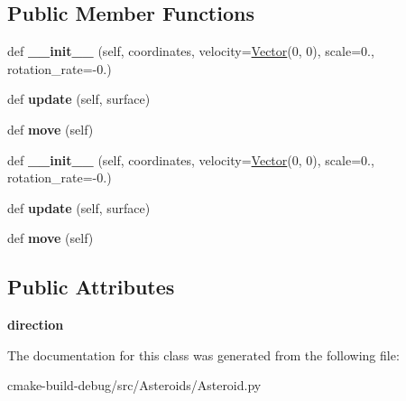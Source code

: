 \subsection*{Public Member Functions}
\begin{DoxyCompactItemize}
\item 
def {\bfseries \+\_\+\+\_\+init\+\_\+\+\_\+} (self, coordinates, velocity=\hyperlink{classVector_1_1Vector}{Vector}(0, 0), scale=0., rotation\+\_\+rate=-\/0.)\hypertarget{classAsteroid_1_1Asteroid_a97fe00ef73eaa80de7eec57530565e7c}{}\label{classAsteroid_1_1Asteroid_a97fe00ef73eaa80de7eec57530565e7c}

\item 
def {\bfseries update} (self, surface)\hypertarget{classAsteroid_1_1Asteroid_ac5a9f9ae0dfd3ff4aa2dabfdd820ebd1}{}\label{classAsteroid_1_1Asteroid_ac5a9f9ae0dfd3ff4aa2dabfdd820ebd1}

\item 
def {\bfseries move} (self)\hypertarget{classAsteroid_1_1Asteroid_af44489831e21c1caa55035370f671d41}{}\label{classAsteroid_1_1Asteroid_af44489831e21c1caa55035370f671d41}

\item 
def {\bfseries \+\_\+\+\_\+init\+\_\+\+\_\+} (self, coordinates, velocity=\hyperlink{classVector_1_1Vector}{Vector}(0, 0), scale=0., rotation\+\_\+rate=-\/0.)\hypertarget{classAsteroid_1_1Asteroid_a97fe00ef73eaa80de7eec57530565e7c}{}\label{classAsteroid_1_1Asteroid_a97fe00ef73eaa80de7eec57530565e7c}

\item 
def {\bfseries update} (self, surface)\hypertarget{classAsteroid_1_1Asteroid_ac5a9f9ae0dfd3ff4aa2dabfdd820ebd1}{}\label{classAsteroid_1_1Asteroid_ac5a9f9ae0dfd3ff4aa2dabfdd820ebd1}

\item 
def {\bfseries move} (self)\hypertarget{classAsteroid_1_1Asteroid_af44489831e21c1caa55035370f671d41}{}\label{classAsteroid_1_1Asteroid_af44489831e21c1caa55035370f671d41}

\end{DoxyCompactItemize}
\subsection*{Public Attributes}
\begin{DoxyCompactItemize}
\item 
{\bfseries direction}\hypertarget{classAsteroid_1_1Asteroid_a0a8ab6e30ef6f80384878b4eb4e60d25}{}\label{classAsteroid_1_1Asteroid_a0a8ab6e30ef6f80384878b4eb4e60d25}

\end{DoxyCompactItemize}


The documentation for this class was generated from the following file\+:\begin{DoxyCompactItemize}
\item 
cmake-\/build-\/debug/src/\+Asteroids/Asteroid.\+py\end{DoxyCompactItemize}
